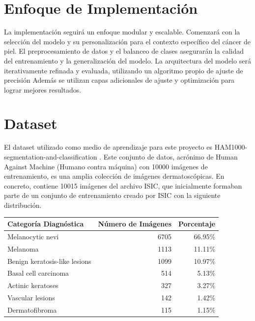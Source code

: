 \section{Enfoque de Implementación}

La implementación seguirá un enfoque modular y escalable. Comenzará con la selección del modelo y su personalización para el contexto específico del cáncer de piel. El preprocesamiento de datos y el balanceo de clases asegurarán la calidad del entrenamiento y la generalización del modelo. La arquitectura del modelo será iterativamente refinada y evaluada, utilizando un algoritmo propio de ajuste de precisión Además se utilizan capas adicionales de ajuste y optimización para lograr mejores resultados.
\section{Dataset}

El dataset utilizado como medio de aprendizaje para este proyecto es HAM1000-segmentation-and-classification . Este conjunto de datos, acrónimo de Human Against Machine (Humano contra máquina) con 10000 imágenes de entrenamiento, es una amplia colección de imágenes dermatoscópicas. En concreto, contiene 10015 imágenes del archivo ISIC, que inicialmente formaban parte de un conjunto de entrenamiento creado por ISIC  con la siguiente distribución.


\begin{tabular}{lrr}
   \hline
   \textbf{Categoría Diagnóstica} & \textbf{Número de Imágenes} & \textbf{Porcentaje} \\
   \hline
   Melanocytic nevi               & 6705                        & 66.95\%             \\
   Melanoma                       & 1113                        & 11.11\%             \\
   Benign keratosis-like lesions  & 1099                        & 10.97\%             \\
   Basal cell carcinoma           & 514                         & 5.13\%              \\
   Actinic keratoses              & 327                         & 3.27\%              \\
   Vascular lesions               & 142                         & 1.42\%              \\
   Dermatofibroma                 & 115                         & 1.15\%              \\
   \hline
   \end{tabular}

